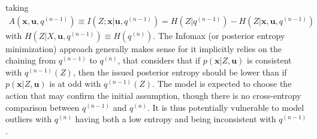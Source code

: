 \documentclass{article}
\begin{document}
taking
\begin{align}A(\boldsymbol{x}, \boldsymbol{u}, q^{(n-1)}) \equiv I(Z; \boldsymbol{x}|\boldsymbol{u}, q^{(n-1)})
= H(Z|q^{(n-1)}) - H(Z|\boldsymbol{x}, \boldsymbol{u}, q^{(n-1)})
\label{eq:infomax}
\end{align}
with  $H(Z|X, \boldsymbol{u}, q^{(n-1)}) \equiv H(q^{(n)})$.
The Infomax (or posterior entropy minimization) approach generally makes sense for it implicitly relies on the chaining from $q^{(n-1)}$ to $q^{(n)}$, that considers that if $p(\boldsymbol{x}|Z, \boldsymbol{u})$ is consistent with $q^{(n-1)}(Z)$, then the issued posterior entropy should be lower than if $p(\boldsymbol{x}|Z, \boldsymbol{u})$ is at odd with $q^{(n-1)}(Z)$. The model is expected to choose the action that may confirm the initial assumption, though there is no cross-entropy comparison between $q^{(n-1)}$ and $q^{(n)}$.
It is thus potentially vulnerable to model outliers with $q^{(n)}$ having both a low entropy and being inconsistent with $q^{(n-1)}$. 
\end{document}
